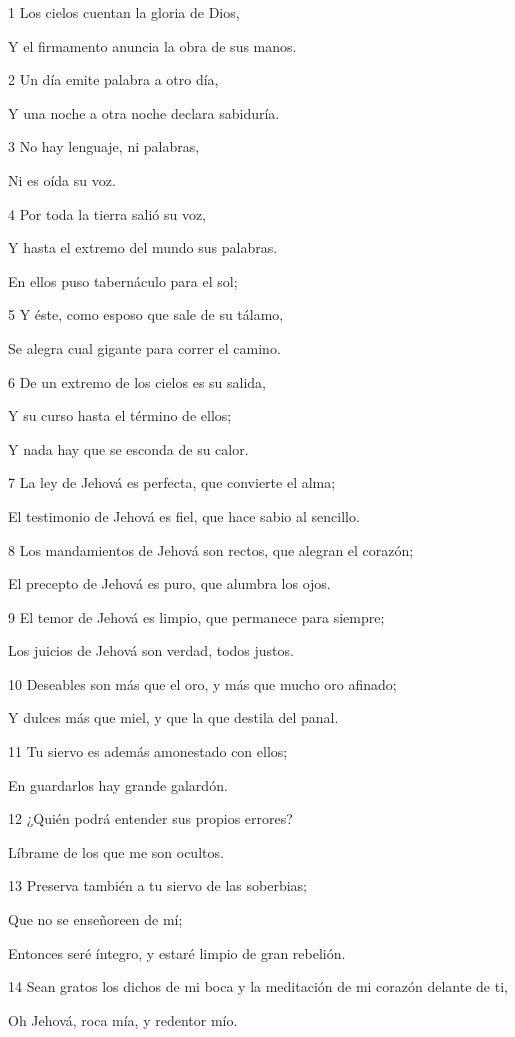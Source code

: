 \par 1 Los cielos cuentan la gloria de Dios,
\par Y el firmamento anuncia la obra de sus manos.
\par 2 Un día emite palabra a otro día,
\par Y una noche a otra noche declara sabiduría.
\par 3 No hay lenguaje, ni palabras,
\par Ni es oída su voz.
\par 4 Por toda la tierra salió su voz,
\par Y hasta el extremo del mundo sus palabras.
\par En ellos puso tabernáculo para el sol;
\par 5 Y éste, como esposo que sale de su tálamo,
\par Se alegra cual gigante para correr el camino.
\par 6 De un extremo de los cielos es su salida,
\par Y su curso hasta el término de ellos;
\par Y nada hay que se esconda de su calor.
\par 7 La ley de Jehová es perfecta, que convierte el alma;
\par El testimonio de Jehová es fiel, que hace sabio al sencillo.
\par 8 Los mandamientos de Jehová son rectos, que alegran el corazón;
\par El precepto de Jehová es puro, que alumbra los ojos.
\par 9 El temor de Jehová es limpio, que permanece para siempre;
\par Los juicios de Jehová son verdad, todos justos.
\par 10 Deseables son más que el oro, y más que mucho oro afinado;
\par Y dulces más que miel, y que la que destila del panal.
\par 11 Tu siervo es además amonestado con ellos;
\par En guardarlos hay grande galardón.
\par 12 ¿Quién podrá entender sus propios errores?
\par Líbrame de los que me son ocultos.
\par 13 Preserva también a tu siervo de las soberbias;
\par Que no se enseñoreen de mí;
\par Entonces seré íntegro, y estaré limpio de gran rebelión.
\par 14 Sean gratos los dichos de mi boca y la meditación de mi corazón delante de ti,
\par Oh Jehová, roca mía, y redentor mío.

